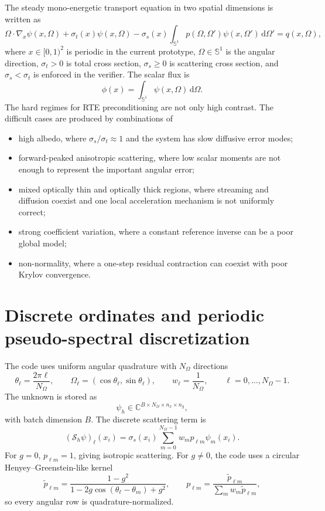 \documentclass[11pt]{article}
\newcommand{\C}{\mathbb{C}}
\newcommand{\dd}{\mathrm{d}}
\newcommand{\angles}{N_{\Omega}}
\newcommand{\om}{\Omega}
\begin{document}
The steady mono-energetic transport equation in two spatial dimensions is
written as
\begin{equation}
  \om\cdot \nabla_x \psi(x,\om)
  + \sigma_t(x)\psi(x,\om)
  - \sigma_s(x)\int_{\mathbb{S}^1} p(\om,\om')\psi(x,\om')\,\dd\om'
  = q(x,\om),
  \label{eq:continuous-rte}
\end{equation}
where \(x\in [0,1)^2\) is periodic in the current prototype,
\(\om\in\mathbb{S}^1\) is the angular direction, \(\sigma_t>0\) is total
cross section, \(\sigma_s\ge 0\) is scattering cross section, and
\(\sigma_s<\sigma_t\) is enforced in the verifier.  The scalar flux is
\begin{equation}
  \phi(x)=\int_{\mathbb{S}^1}\psi(x,\om)\,\dd\om.
\end{equation}
The hard regimes for RTE preconditioning are not only high contrast.  The
difficult cases are produced by combinations of
\begin{itemize}
  \item high albedo, where \(\sigma_s/\sigma_t \approx 1\) and the system has
  slow diffusive error modes;
  \item forward-peaked anisotropic scattering, where low scalar moments are not
  enough to represent the important angular error;
  \item mixed optically thin and optically thick regions, where streaming and
  diffusion coexist and one local acceleration mechanism is not uniformly
  correct;
  \item strong coefficient variation, where a constant reference inverse can be
  a poor global model;
  \item non-normality, where a one-step residual contraction can coexist with
  poor Krylov convergence.
\end{itemize}

\section{Discrete ordinates and periodic pseudo-spectral discretization}

The code uses uniform angular quadrature with \(\angles\) directions
\begin{equation}
  \theta_\ell = \frac{2\pi \ell}{\angles},\qquad
  \om_\ell=(\cos\theta_\ell,\sin\theta_\ell),\qquad
  w_\ell=\frac{1}{\angles},
  \qquad \ell=0,\ldots,\angles-1.
\end{equation}
The unknown is stored as
\[
  \psi_h \in \C^{B\times \angles\times n_x\times n_y},
\]
with batch dimension \(B\).  The discrete scattering term is
\begin{equation}
  (\mathcal{S}_h\psi)_\ell(x_i)
  =
  \sigma_s(x_i)\sum_{m=0}^{\angles-1}w_m p_{\ell m}\psi_m(x_i).
\end{equation}
For \(g=0\), \(p_{\ell m}=1\), giving isotropic scattering.  For \(g\ne 0\),
the code uses a circular Henyey--Greenstein-like kernel
\begin{equation}
  \tilde p_{\ell m}
  =
  \frac{1-g^2}{1-2g\cos(\theta_\ell-\theta_m)+g^2},
  \qquad
  p_{\ell m}
  =
  \frac{\tilde p_{\ell m}}
       {\sum_m w_m\tilde p_{\ell m}},
\end{equation}
so every angular row is quadrature-normalized.
\end{document}
